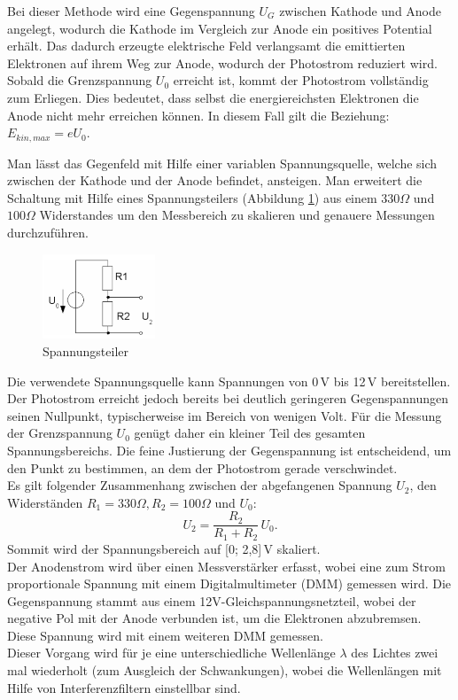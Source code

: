 Bei dieser Methode wird eine Gegenspannung $U_G$ zwischen Kathode und Anode angelegt, wodurch die Kathode im Vergleich zur Anode ein positives Potential erhält.
Das dadurch erzeugte elektrische Feld verlangsamt die emittierten Elektronen auf ihrem Weg zur Anode, wodurch der Photostrom reduziert wird. Sobald die Grenzspannung $U_0$ erreicht ist, kommt der Photostrom vollständig zum Erliegen. 
Dies bedeutet, dass selbst die energiereichsten Elektronen die Anode nicht mehr erreichen können. In diesem Fall gilt die Beziehung: 
$E_{kin,max} = eU_0$.

Man lässt das Gegenfeld mit Hilfe einer variablen Spannungsquelle, welche sich zwischen der Kathode und der Anode befindet, ansteigen.
Man erweitert die Schaltung mit Hilfe eines Spannungsteilers (Abbildung \ref{fig:spannungsteiler}) aus einem $330\Omega$ und $100\Omega$ Widerstandes um den Messbereich zu skalieren und genauere Messungen durchzuführen.
\begin{figure}[htbp]
    \centering
    \includegraphics[width=0.3\textwidth]{figs/Spannungsteiler.png}
    \caption{ Spannungsteiler \cite{Spannungsteiler}}
    \label{fig:spannungsteiler}
\end{figure}
\FloatBarrier
Die verwendete Spannungsquelle kann Spannungen von 0\,V bis 12\,V bereitstellen. 
Der Photostrom erreicht jedoch bereits bei deutlich geringeren Gegenspannungen seinen Nullpunkt, typischerweise im Bereich von wenigen Volt. 
Für die Messung der Grenzspannung $U_0$ genügt daher ein kleiner Teil des gesamten Spannungsbereichs. 
Die feine Justierung der Gegenspannung ist entscheidend, um den Punkt zu bestimmen, an dem der Photostrom gerade verschwindet.\\
Es gilt folgender Zusammenhang zwischen der abgefangenen Spannung $U_2$, den Widerständen $R_1 = 330 \Omega, R_2 = 100 \Omega$ und $U_0$:
\begin{equation}
  U_2 = \frac{R_2}{R_1 + R_2}\,U_0.
\end{equation}
Sommit wird der Spannungsbereich auf [0; 2{,}8]\,V skaliert.\\

Der Anodenstrom wird über einen Messverstärker erfasst, 
wobei eine zum Strom proportionale Spannung mit einem 
Digitalmultimeter (DMM) gemessen wird. Die Gegenspannung 
stammt aus einem 12V-Gleichspannungsnetzteil, 
wobei der negative Pol mit der Anode verbunden ist, 
um die Elektronen abzubremsen. Diese Spannung wird 
mit einem weiteren DMM gemessen.\\
Dieser Vorgang wird für je eine unterschiedliche Wellenlänge
$\lambda$ des Lichtes zwei mal wiederholt (zum Ausgleich der Schwankungen), wobei die
Wellenlängen mit Hilfe von Interferenzfiltern
einstellbar sind.

